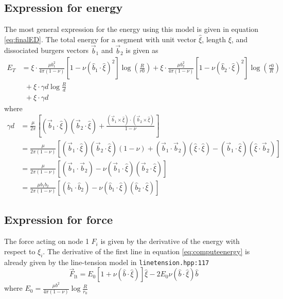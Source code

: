 \documentclass[10pt,a4paper,final]{article}
\begin{document}
\subsection{Expression for energy}
The most general expression for the energy using this model is given in equation \ref{eq:finalED}. The total energy for a segment with unit vector $\hat{\xi}$, length $\xi$, and dissociated burgers vectors $\vec{b}_1$ and $\vec{b}_2$ is given as
\begin{equation}
\begin{split}
E_T &= \xi\cdot\frac{\mu b_1^2}{4\pi(1-\nu)}\left[1-\nu(\hat{b}_1\cdot\hat{\xi})^2\right]\log\left(\frac{R}{r0}\right) + \xi\cdot\frac{\mu b_2^2}{4\pi(1-\nu)}\left[1-\nu(\hat{b}_2\cdot\hat{\xi})^2\right]\log\left(\frac{r0}{R}\right) \\
 & ~~ + \xi\cdot\gamma d\log\frac{R}{d} \\
 & ~~ + \xi\cdot\gamma d
\end{split}
\label{eq:computeenergy}
\end{equation}
where
\begin{equation}
\begin{split}
\gamma d &= \frac{\mu}{2\pi} \left[ \left(\vec{b}_1\cdot\hat{\xi}\right)\left(\vec{b}_2\cdot\hat{\xi}\right) + \frac{\left(\vec{b}_1\times\hat{\xi}\right)\cdot\left(\vec{b}_2\times\hat{\xi}\right)}{1-\nu}\right] \\
&= \frac{\mu}{2\pi(1-\nu)}
\left[ \left(\vec{b}_1\cdot\hat{\xi}\right)\left(\vec{b}_2\cdot\hat{\xi}\right)(1-\nu) + \left(\vec{b}_1\cdot\vec{b}_2\right)\left(\hat{\xi}\cdot\hat{\xi}\right) - \left(\vec{b}_1\cdot\hat{\xi}\right)\left(\hat{\xi}\cdot\vec{b}_2\right)\right] \\
&= \frac{\mu}{2\pi(1-\nu)} \left[\left(\vec{b}_1\cdot\vec{b}_2\right) - \nu\left(\vec{b}_1\cdot\hat{\xi}\right)\left(\vec{b}_2\cdot\hat{\xi}\right)\right] \\
&= \frac{\mu b_1b_2}{2\pi(1-\nu)}\left[\left(\hat{b}_1\cdot\hat{b}_2\right) - \nu\left(\hat{b}_1\cdot\hat{\xi}\right)\left(\hat{b}_2\cdot\hat{\xi}\right)\right]
\end{split}
\label{eq:gammadnumodis}
\end{equation}
\subsection{Expression for force}
The force acting on node 1 $F_i$ is given by the derivative of the energy with respect to $\xi_i$. The derivative of the first line in equation \ref{eq:computeenergy} is already given by the line-tension model in \texttt{linetension.hpp:117}
\begin{equation}
\vec{F}_{\text{lt}} = E_0\left[1+\nu\left(\hat{b}\cdot\hat{\xi}\right)\right]\hat{\xi} - 2E_0\nu\left(\hat{b}\cdot\hat{\xi}\right)\hat{b}
\label{eq:computeforcelt}
\end{equation}
where $E_0 = \frac{\mu b^2}{4\pi(1-\nu)}\log\frac{R}{r_0}$\\
\end{document}

